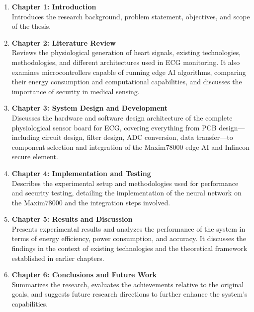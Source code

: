 \begin{enumerate}
	\item \textbf{Chapter 1: Introduction} \\
	Introduces the research background, problem statement, objectives, and scope of the thesis.
	\item \textbf{Chapter 2: Literature Review} \\
	Reviews the physiological generation of heart signals, existing technologies, methodologies, and different architectures used in ECG monitoring. It also examines microcontrollers capable of running edge AI algorithms, comparing their energy consumption and computational capabilities, and discusses the importance of security in medical sensing.
	\item \textbf{Chapter 3: System Design and Development} \\
	Discusses the hardware and software design architecture of the complete physiological sensor board for ECG, covering everything from PCB design—including circuit design, filter design, \ac{ADC} conversion, data transfer—to component selection and integration of the Maxim78000 edge AI and Infineon secure element.
	\item \textbf{Chapter 4: Implementation and Testing} \\
	Describes the experimental setup and methodologies used for performance and security testing, detailing the implementation of the neural network on the Maxim78000 and the integration steps involved.
	\item \textbf{Chapter 5: Results and Discussion} \\
	Presents experimental results and analyzes the performance of the system in terms of energy efficiency, power consumption, and accuracy. It discusses the findings in the context of existing technologies and the theoretical framework established in earlier chapters.
	\item \textbf{Chapter 6: Conclusions and Future Work} \\
	Summarizes the research, evaluates the achievements relative to the original goals, and suggests future research directions to further enhance the system’s capabilities.
\end{enumerate}
